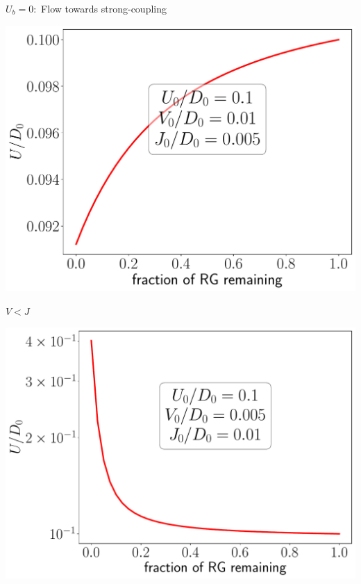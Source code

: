 \documentclass[aspectratio=169]{beamer}
\begin{document}
\begin{frame}[noframenumbering]{\(U_b = 0:\) Flow towards strong-coupling}
{\begin{minipage}{0.49\textwidth}
\includegraphics[width=\textwidth]{figures/U_irr,U>0,U.pdf}
\end{minipage}
\begin{minipage}{0.49\textwidth}
\centering
{\large\( V < J\)}

\includegraphics[width=\textwidth]{figures/U_rel,U>0,U.pdf}
\end{minipage}
}

\end{frame}
\end{document}

